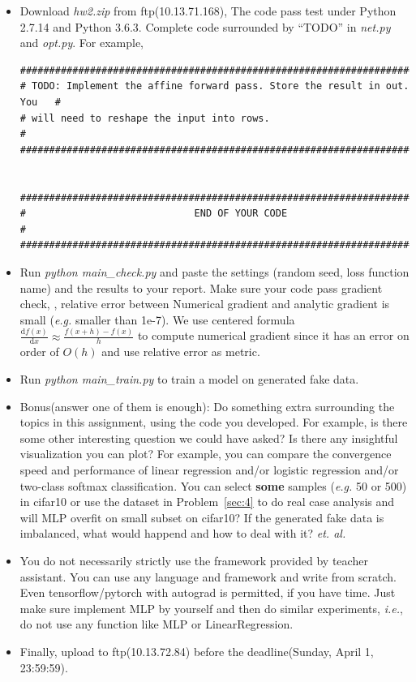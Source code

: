 \documentclass[12pt]{article}
\begin{document}
\begin{itemize}

	\item Download \textit{hw2.zip} from ftp(10.13.71.168), The code pass test under Python 2.7.14 and Python 3.6.3. Complete code surrounded by ``TODO'' in \textit{net.py} and \textit{opt.py}. For example,
	      \begin{verbatim}
###########################################################################
# TODO: Implement the affine forward pass. Store the result in out. You   #
# will need to reshape the input into rows.                               #
###########################################################################


###########################################################################
#                             END OF YOUR CODE                            #
###########################################################################
	\end{verbatim}
	\item Run \textit{python main\_check.py} and paste the settings (\eg random seed, loss function name) and the results to  your report.  Make sure your code pass gradient check, \eg, relative error between Numerical gradient and analytic gradient is small (\textit{e.g.} smaller than 1e-7). We use centered formula $\displaystyle \frac{\mathrm{d}f(x)}{\mathrm{d}x} \approx \frac{f(x+h)-f(x)}{h}$ to compute numerical gradient since it has an error on order of $O(h)$ and use relative error as metric.
	\item Run \textit{python main\_train.py} to train a model on generated fake data.
	\item {{Bonus(answer one of them is enough)}}: Do something extra surrounding the topics in this assignment, using the code you developed. For example, is there some other interesting question we could have asked? Is there any insightful visualization you can plot? For example, you can compare the convergence speed and performance of  linear regression and/or logistic regression and/or two-class softmax classification. You can select \textbf{some} samples (\textit{e.g.} 50 or 500) in cifar10 or use the dataset in {Problem~\ref{sec:4}} to do real case analysis and will MLP overfit on small subset on cifar10? If the generated fake data is imbalanced, what would happend and how to deal with it?  \textit{et. al.}
	\item You do not necessarily strictly use the framework provided by teacher assistant. You can use any language and framework and write from scratch.
	      Even tensorflow/pytorch with autograd is permitted, if you have time.
	      Just make sure implement MLP by yourself and then do similar experiments, \textit{i.e.}, do not use any function like MLP or LinearRegression.
	\item Finally, upload to ftp(10.13.72.84) before the deadline(Sunday, April 1, 23:59:59).
\end{itemize}
\end{document}
